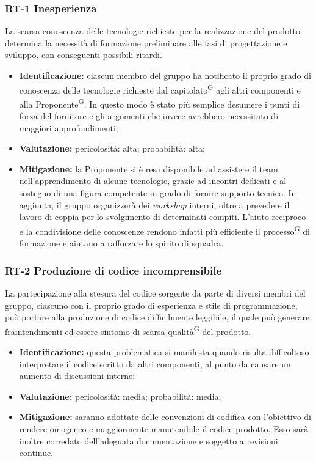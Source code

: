 \documentclass[8pt]{article}
\newcommand{\glossterm}[1]{#1\textsuperscript{G}} %
\begin{document}
\subsubsection{RT-1 Inesperienza}
La scarsa conoscenza delle tecnologie richieste per la realizzazione del prodotto determina la necessità di formazione preliminare alle fasi di progettazione e sviluppo, con conseguenti possibili ritardi.
\begin{itemize}
\setlength\itemsep{0em}
    \item \textbf{Identificazione:} ciascun membro del gruppo ha notificato il proprio grado di conoscenza delle tecnologie richieste dal \glossterm{capitolato} agli altri componenti e alla \glossterm{Proponente}. In questo modo è stato più semplice desumere i punti di forza del fornitore e gli argomenti che invece avrebbero necessitato di maggiori approfondimenti;
    \item \textbf{Valutazione:} pericolosità: alta; probabilità: alta;
    \item \textbf{Mitigazione:} la Proponente si è resa disponibile ad assistere il team nell'apprendimento di alcune tecnologie, grazie ad incontri dedicati e al sostegno di una figura competente in grado di fornire supporto tecnico. In aggiunta, il gruppo organizzerà dei \textit{workshop} interni, oltre a prevedere il lavoro di coppia per lo svolgimento di determinati compiti. L'aiuto reciproco e la condivisione delle conoscenze rendono infatti più efficiente il \glossterm{processo} di formazione e aiutano a rafforzare lo spirito di squadra.
\end{itemize}
\subsubsection{RT-2 Produzione di codice incomprensibile}
La partecipazione alla stesura del codice sorgente da parte di diversi membri del gruppo, ciascuno con il proprio grado di esperienza e stile di programmazione, può portare alla produzione di codice difficilmente leggibile, il quale può generare fraintendimenti ed essere sintomo di scarsa \glossterm{qualità} del prodotto. 
\begin{itemize}
\setlength\itemsep{0em}
    \item \textbf{Identificazione:} questa problematica si manifesta quando risulta difficoltoso interpretare il codice scritto da altri componenti, al punto da causare un aumento di discussioni interne;
    \item \textbf{Valutazione:} pericolosità: media; probabilità: media;
    \item \textbf{Mitigazione:} saranno adottate delle convenzioni di codifica con l'obiettivo di rendere omogeneo e maggiormente manutenibile il codice prodotto. Esso sarà inoltre corredato dell'adeguata documentazione e soggetto a revisioni continue.
\end{itemize}
\end{document}
